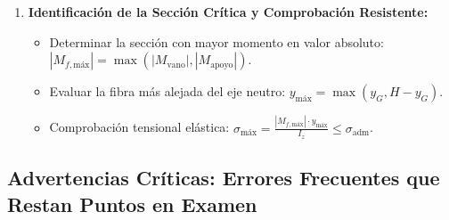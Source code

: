 \begin{enumerate}[label=\bfseries Paso \arabic*:]
    \item \textbf{Identificación de la Sección Crítica y Comprobación Resistente:}
          \begin{itemize}
              \item Determinar la sección con mayor momento en valor absoluto: $|M_{f,\text{máx}}| = \max(|M_{\text{vano}}|, |M_{\text{apoyo}}|)$.
              \item Evaluar la fibra más alejada del eje neutro: $y_{\text{máx}} = \max(y_G, H - y_G)$.
              \item Comprobación tensional elástica: $\sigma_{\text{máx}} = \frac{|M_{f,\text{máx}}| \cdot y_{\text{máx}}}{I_z} \le \sigma_{\text{adm}}$.
          \end{itemize}
\end{enumerate}

\subsection{Advertencias Críticas: Errores Frecuentes que Restan Puntos en Examen}

